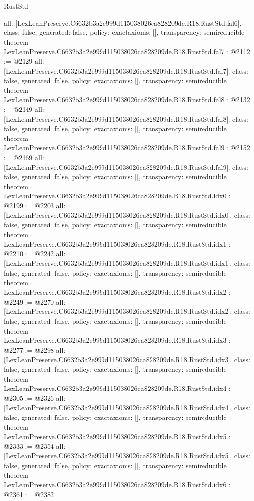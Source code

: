 \begin{lexlean}{RustStd}
\begin{coremodule}
{  all: [LexLeanPreserve.C6632b3a2e999d115038026ca828209de.R18.RustStd.fal6],
  class: false,
  generated: false,
  policy: exact{axioms: []},
  transparency: semireducible
}
theorem LexLeanPreserve.C6632b3a2e999d115038026ca828209de.R18.RustStd.fal7 : @2112 := @2129 {
  all: [LexLeanPreserve.C6632b3a2e999d115038026ca828209de.R18.RustStd.fal7],
  class: false,
  generated: false,
  policy: exact{axioms: []},
  transparency: semireducible
}
theorem LexLeanPreserve.C6632b3a2e999d115038026ca828209de.R18.RustStd.fal8 : @2132 := @2149 {
  all: [LexLeanPreserve.C6632b3a2e999d115038026ca828209de.R18.RustStd.fal8],
  class: false,
  generated: false,
  policy: exact{axioms: []},
  transparency: semireducible
}
theorem LexLeanPreserve.C6632b3a2e999d115038026ca828209de.R18.RustStd.fal9 : @2152 := @2169 {
  all: [LexLeanPreserve.C6632b3a2e999d115038026ca828209de.R18.RustStd.fal9],
  class: false,
  generated: false,
  policy: exact{axioms: []},
  transparency: semireducible
}
theorem LexLeanPreserve.C6632b3a2e999d115038026ca828209de.R18.RustStd.idx0 : @2199 := @2203 {
  all: [LexLeanPreserve.C6632b3a2e999d115038026ca828209de.R18.RustStd.idx0],
  class: false,
  generated: false,
  policy: exact{axioms: []},
  transparency: semireducible
}
theorem LexLeanPreserve.C6632b3a2e999d115038026ca828209de.R18.RustStd.idx1 : @2210 := @2242 {
  all: [LexLeanPreserve.C6632b3a2e999d115038026ca828209de.R18.RustStd.idx1],
  class: false,
  generated: false,
  policy: exact{axioms: []},
  transparency: semireducible
}
theorem LexLeanPreserve.C6632b3a2e999d115038026ca828209de.R18.RustStd.idx2 : @2249 := @2270 {
  all: [LexLeanPreserve.C6632b3a2e999d115038026ca828209de.R18.RustStd.idx2],
  class: false,
  generated: false,
  policy: exact{axioms: []},
  transparency: semireducible
}
theorem LexLeanPreserve.C6632b3a2e999d115038026ca828209de.R18.RustStd.idx3 : @2277 := @2298 {
  all: [LexLeanPreserve.C6632b3a2e999d115038026ca828209de.R18.RustStd.idx3],
  class: false,
  generated: false,
  policy: exact{axioms: []},
  transparency: semireducible
}
theorem LexLeanPreserve.C6632b3a2e999d115038026ca828209de.R18.RustStd.idx4 : @2305 := @2326 {
  all: [LexLeanPreserve.C6632b3a2e999d115038026ca828209de.R18.RustStd.idx4],
  class: false,
  generated: false,
  policy: exact{axioms: []},
  transparency: semireducible
}
theorem LexLeanPreserve.C6632b3a2e999d115038026ca828209de.R18.RustStd.idx5 : @2333 := @2354 {
  all: [LexLeanPreserve.C6632b3a2e999d115038026ca828209de.R18.RustStd.idx5],
  class: false,
  generated: false,
  policy: exact{axioms: []},
  transparency: semireducible
}
theorem LexLeanPreserve.C6632b3a2e999d115038026ca828209de.R18.RustStd.idx6 : @2361 := @2382 {
}
\end{coremodule}
\end{lexlean}
